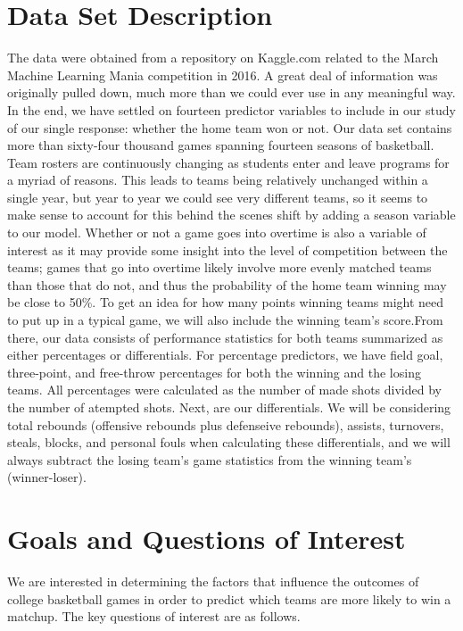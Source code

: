 \documentclass[12pt]{article}\usepackage[]{graphicx}\usepackage[]{color}
\begin{document}
\section{Data Set Description}
The data were obtained from a repository on Kaggle.com related to the March Machine Learning Mania competition in 2016. A great deal of information was originally pulled down, much more than we could ever use in any meaningful way. In the end, we have settled on fourteen predictor variables to include in our study of our single response: whether the home team won or not. Our data set contains more than sixty-four thousand games spanning fourteen seasons of basketball. Team rosters are continuously changing as students enter and leave programs for a myriad of reasons. This leads to teams being relatively unchanged within a single year, but year to year we could see very different teams, so it seems to make sense to account for this behind the scenes shift by adding a season variable to our model. Whether or not a game goes into overtime is also a variable of interest as it may provide some insight into the level of competition between the teams; games that go into overtime likely involve more evenly matched teams than those that do not, and thus the probability of the home team winning may be close to 50\%. To get an idea for how many points winning teams might need to put up in a typical game, we will also include the winning team's score.From there, our data consists of performance statistics for both teams summarized as either percentages or differentials. For percentage predictors, we have field goal, three-point, and free-throw percentages for both the winning and the losing teams. All percentages were calculated as the number of made shots divided by the number of atempted shots. Next, are our differentials. We will be considering total rebounds (offensive rebounds plus defenseive rebounds), assists, turnovers, steals, blocks, and personal fouls when calculating these differentials, and we will always subtract the losing team's game statistics from the winning team's (winner-loser).

\section{Goals and Questions of Interest}
We are interested in determining the factors that influence the outcomes of college basketball games in order to predict which teams are more likely to win a matchup. The key questions of interest are as follows.
\end{document}

